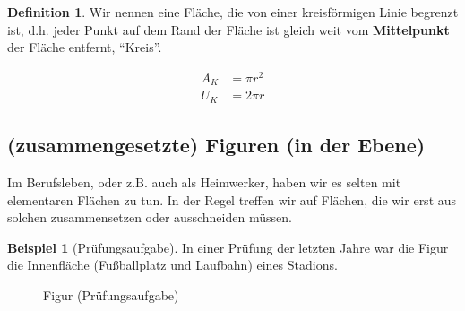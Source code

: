 \documentclass[a4paper]{book}%
\theoremstyle{definition}
\newtheorem{definition}{Definition}
\newtheorem{beispiel}{Beispiel}
\begin{document}
\begin{definition}
    Wir nennen eine Fläche, die von einer kreisförmigen Linie begrenzt ist, d.h. jeder Punkt auf dem Rand der Fläche ist gleich weit vom \textbf{Mittelpunkt} der Fläche entfernt, \enquote{Kreis}.
\end{definition}

\begin{align}\label{eqn:Kreis}
  A_K &= \pi r^2 \\
  U_K &= 2 \pi r
\end{align}


\subsection{(zusammengesetzte) Figuren (in der Ebene)}

Im Berufsleben, oder z.B. auch als Heimwerker, haben wir es selten mit elementaren Flächen zu tun. In der Regel treffen wir auf Flächen, die wir erst aus solchen zusammensetzen oder ausschneiden müssen.


\begin{beispiel}[Prüfungsaufgabe]
    In einer Prüfung der letzten Jahre war die Figur die Innenfläche (Fußballplatz und Laufbahn) eines Stadions.

\begin{figure}
  \centering
  \caption{Figur (Prüfungsaufgabe)}\label{fig:FigurPruefungsaufgabeStadion}
\end{figure}

\end{beispiel}
\end{document}
